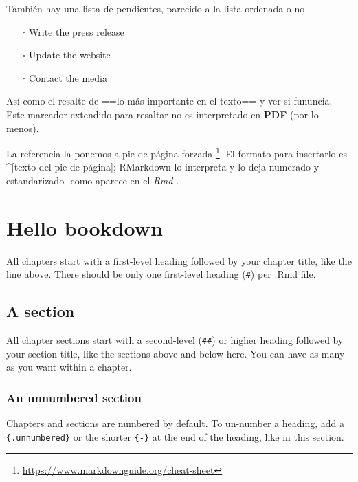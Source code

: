 \documentclass[
  11pt,
  twoside]{book}
\providecommand{\tightlist}{%
  \setlength{\itemsep}{0pt}\setlength{\parskip}{0pt}}
\theoremstyle{definition}
\theoremstyle{definition}
\theoremstyle{definition}
\theoremstyle{definition}
\theoremstyle{remark}
\begin{document}
También hay una lista de pendientes, parecido a la lista ordenada o no

\begin{itemize}
\tightlist
\item[$\square$]
  Write the press release
\item[$\square$]
  Update the website
\item[$\square$]
  Contact the media
\end{itemize}

Así como el resalte de ==lo más importante en el texto== y ver si fununcia. Este marcador extendido para resaltar no es interpretado en \textbf{PDF} (por lo menos).

La referencia la ponemos a pie de página forzada \footnote{\url{https://www.markdownguide.org/cheat-sheet}}. El formato para insertarlo es \^{}{[}texto del pie de página{]}; RMarkdown lo interpreta y lo deja numerado y estandarizado -como aparece en el \emph{Rmd}-.

\hypertarget{hello-bookdown}{%
\chapter*{Hello bookdown}\label{hello-bookdown}}

All chapters start with a first-level heading followed by your chapter title, like the line above. There should be only one first-level heading (\texttt{\#}) per .Rmd file.

\hypertarget{a-section}{%
\section{A section}\label{a-section}}

All chapter sections start with a second-level (\texttt{\#\#}) or higher heading followed by your section title, like the sections above and below here. You can have as many as you want within a chapter.

\hypertarget{an-unnumbered-section}{%
\subsection*{An unnumbered section}\label{an-unnumbered-section}}

Chapters and sections are numbered by default. To un-number a heading, add a \texttt{\{.unnumbered\}} or the shorter \texttt{\{-\}} at the end of the heading, like in this section.
\end{document}
